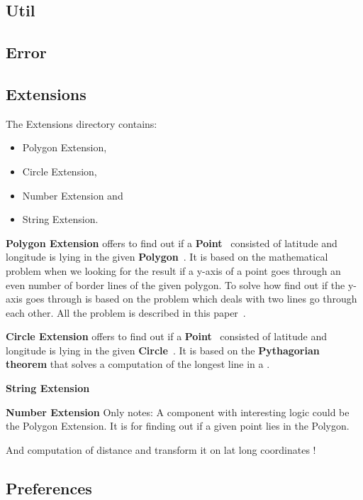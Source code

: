 \subsection{Util}\label{subsec:util}

\subsection{Error}\label{subsec:error}

\subsection{Extensions}\label{subsec:extensions}
The Extensions directory contains:
\begin{itemize}
    \item Polygon Extension,
    \item Circle Extension,
    \item Number Extension and
    \item String Extension.
\end{itemize}
\textbf{Polygon Extension} offers to find out if a \textbf{Point}~\cite{} consisted of latitude and longitude is lying in the given \textbf{Polygon}~\cite{}.
It is based on the mathematical problem when we looking for the result if a y-axis of a point goes through an even number of border lines of the given polygon.
To solve how find out if the y-axis goes through is based on the problem which deals with two lines go through each other.
All the problem is described in this paper~\cite{}.

\textbf{Circle Extension} offers to find out if a \textbf{Point}~\cite{} consisted of latitude and longitude is lying in the given \textbf{Circle}~\cite{}.
It is based on the \textbf{Pythagorian theorem} that solves a computation of the longest line in a .

\textbf{String Extension}

\textbf{Number Extension}
Only notes:
A component with interesting logic could be the Polygon Extension.
It is for finding out if a given point lies in the Polygon.

And computation of distance and transform it on lat long coordinates !

\subsection{Preferences}\label{subsec:preferences}
